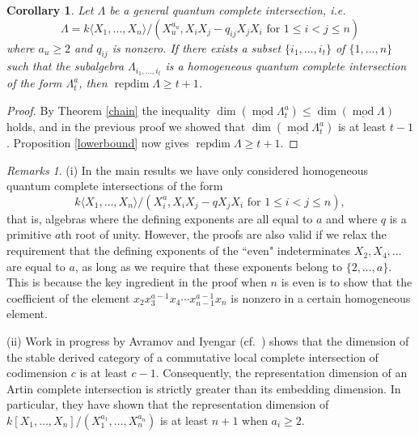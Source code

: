\documentclass[a4paper]{amsart}
\newtheorem{corollary}[theorem]{Corollary}
\theoremstyle{definition}
\theoremstyle{definition}
\theoremstyle{definition}
\theoremstyle{definition}
\theoremstyle{definition}
\theoremstyle{definition}
\theoremstyle{remark}
\theoremstyle{remark}
\newtheorem*{remarks}{Remarks}
\theoremstyle{definition}
\theoremstyle{definition}
\begin{document}
\begin{corollary}\label{subalg}
Let $\Lambda$ be a general quantum complete intersection, i.e.\
$$\Lambda = k \langle X_1, \dots, X_n \rangle / (X_u^{a_u}, X_iX_j -
q_{ij}X_jX_i \text{ for } 1 \le i <j \le n )$$ where $a_u \ge 2$ and
$q_{ij}$ is nonzero. If there exists a subset $\{ i_1, \dots, i_t
\}$ of $\{ 1, \dots, n \}$ such that the subalgebra $\Lambda_{i_1,
\dots, i_t}$ is a homogeneous quantum complete intersection of the
form $\Lambda_t^a$, then ${\operatorname{repdim}\nolimits} \Lambda \ge t+1$.
\end{corollary}

\begin{proof}
By Theorem \ref{chain} the inequality  $\dim ( \underline{\operatorname{mod}\nolimits}
\Lambda_t^a ) \le \dim ( \underline{\operatorname{mod}\nolimits} \Lambda )$ holds, and in
the previous proof we showed that $\dim ( \underline{\operatorname{mod}\nolimits}
\Lambda_t^a )$ is at least $t-1$. Proposition \ref{lowerbound} now
gives ${\operatorname{repdim}\nolimits} \Lambda \ge t+1$.
\end{proof}

\begin{remarks}
(i) In the main results we have only considered homogeneous quantum
complete intersections of the form
$$k \langle X_1, \dots, X_n \rangle / (X_i^a, X_iX_j -
qX_jX_i \text{ for } 1 \le i <j \le n ),$$ that is, algebras where
the defining exponents are all equal to $a$ and where $q$ is a
primitive $a$th root of unity. However, the proofs are also valid if
we relax the requirement that the defining exponents of the ``even"
indeterminates $X_2, X_4, \dots$ are equal to $a$, as long as we
require that these exponents belong to $\{ 2, \dots, a \}$. This is
because the key ingredient in the proof when $n$ is even is to show
that the coefficient of the element $x_2x_3^{a-1}x_4 \cdots
x_{n-1}^{a-1}x_n$ is nonzero in a certain homogeneous element.

(ii) Work in progress by Avramov and Iyengar (cf.\ \cite{Avramov2})
shows that the dimension of the stable derived category of a
commutative local complete intersection of codimension $c$ is at
least $c-1$. Consequently, the representation dimension of an Artin
complete intersection is strictly greater than its embedding
dimension. In particular, they have shown that the representation
dimension of $k[X_1, \dots, X_n]/(X_1^{a_1}, \dots, X_n^{a_n})$ is
at least $n+1$ when $a_i \ge 2$.
\end{remarks}
\end{document}
